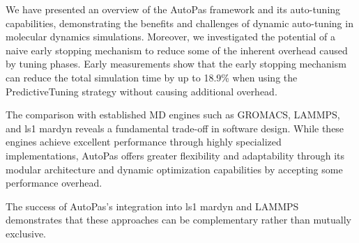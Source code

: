 \documentclass[conference]{IEEEtran}
\begin{document}
We have presented an overview of the AutoPas framework and its auto-tuning capabilities, demonstrating the benefits and challenges of dynamic auto-tuning in molecular dynamics simulations. Moreover, we investigated the potential of a naive early stopping mechanism to reduce some of the inherent overhead caused by tuning phases. Early measurements show that the early stopping mechanism can reduce the total simulation time by up to 18.9\% when using the PredictiveTuning strategy without causing additional overhead.

The comparison with established MD engines such as GROMACS, LAMMPS, and ls1 mardyn reveals a fundamental trade-off in software design. While these engines achieve excellent performance through highly specialized implementations, AutoPas offers greater flexibility and adaptability through its modular architecture and dynamic optimization capabilities by accepting some performance overhead.

The success of AutoPas's integration into ls1 mardyn and LAMMPS demonstrates that these approaches can be complementary rather than mutually exclusive.

\newpage



\end{document}
